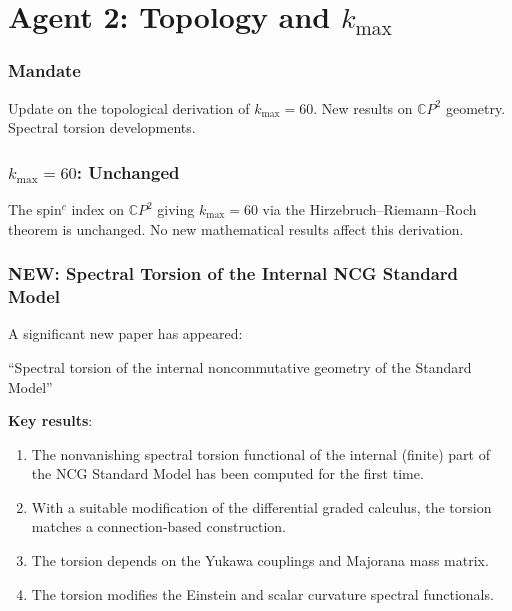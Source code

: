 \documentclass[11pt,a4paper]{article}
\newcommand{\NEW}{\textcolor{dfdblue}{\textbf{NEW}}}
\newcommand{\CP}{\mathbb{C}P}
\begin{document}
\part{Agent 2: Topology and $k_{\max}$}
\label{part:agent2}

\section{Mandate}

Update on the topological derivation of $k_{\max} = 60$. New results on $\CP^2$ geometry. Spectral torsion developments.

\section{$k_{\max} = 60$: Unchanged}

The spin$^c$ index on $\CP^2$ giving $k_{\max} = 60$ via the Hirzebruch--Riemann--Roch theorem is unchanged. No new mathematical results affect this derivation.

\section{\NEW: Spectral Torsion of the Internal NCG Standard Model}

A significant new paper has appeared:

\begin{tcolorbox}[colback=blue!5!white, colframe=blue!60!black,
  title={Chamseddine et al.\ (arXiv:2511.08159, December 2025)}]
``Spectral torsion of the internal noncommutative geometry of the Standard Model''

\textbf{Key results}:
\begin{enumerate}
\item The nonvanishing spectral torsion functional of the internal (finite) part of the NCG Standard Model has been computed for the first time.
\item With a suitable modification of the differential graded calculus, the torsion matches a connection-based construction.
\item The torsion depends on the Yukawa couplings and Majorana mass matrix.
\item The torsion modifies the Einstein and scalar curvature spectral functionals.
\end{enumerate}
\end{tcolorbox}
\end{document}
